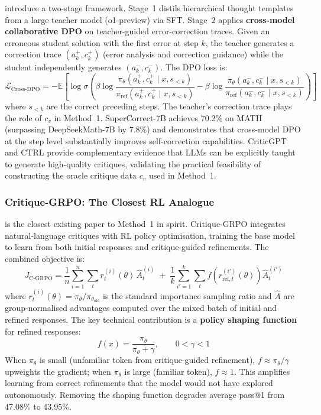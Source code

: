 \autocite{yang2024supercorrect} introduce a two-stage framework. Stage~1 distils hierarchical thought templates from a large teacher model (o1-preview) via SFT. Stage~2 applies \textbf{cross-model collaborative DPO} on teacher-guided error-correction traces. Given an erroneous student solution with the first error at step $k$, the teacher generates a correction trace $(a_k^+, c_k^+)$ (error analysis and correction guidance) while the student independently generates $(a_k^-, c_k^-)$. The DPO loss is:
\begin{equation}
    \mathcal{L}_{\text{Cross-DPO}} = -\mathbb{E}\!\left[\log\sigma\!\left(\beta\log\frac{\pi_\theta(a_k^+, c_k^+ \mid x, s_{<k})}{\pi_{\text{ref}}(a_k^+, c_k^+ \mid x, s_{<k})} - \beta\log\frac{\pi_\theta(a_k^-, c_k^- \mid x, s_{<k})}{\pi_{\text{ref}}(a_k^-, c_k^- \mid x, s_{<k})}\right)\right]
    \label{eq:supercorrect}
\end{equation}
where $s_{<k}$ are the correct preceding steps. The teacher's correction trace plays the role of $c_v$ in Method~1. SuperCorrect-7B achieves 70.2\% on MATH (surpassing DeepSeekMath-7B by 7.8\%) and demonstrates that cross-model DPO at the step level substantially improves self-correction capabilities. CriticGPT \autocite{mcaleese2024llmcriticshelpllm} and CTRL \autocite{xie2025teachinglanguagemodelscritique} provide complementary evidence that LLMs can be explicitly taught to generate high-quality critiques, validating the practical feasibility of constructing the oracle critique data $c_v$ used in Method~1.

\subsubsection{Critique-GRPO: The Closest RL Analogue}
\label{sec:critique-grpo}

\autocite{zhang2025critiquegrpoadvancingllm} is the closest existing paper to Method~1 in spirit. Critique-GRPO integrates natural-language critiques with RL policy optimisation, training the base model to learn from both initial responses and critique-guided refinements. The combined objective is:
\begin{equation}
    J_{\text{C-GRPO}} = \frac{1}{n}\sum_{i=1}^{n}\sum_{t} r_t^{(i)}(\theta)\, \hat{A}_t^{(i)} \;+\; \frac{1}{k}\sum_{i'=1}^{k}\sum_{t} f\!\left(r_{\text{ref},t}^{(i')}(\theta)\right) \hat{A}_t^{(i')}
    \label{eq:critique_grpo}
\end{equation}
where $r_t^{(i)}(\theta) = \pi_\theta / \pi_{\theta_{\text{old}}}$ is the standard importance sampling ratio and $\hat{A}$ are group-normalised advantages computed over the mixed batch of initial and refined responses. The key technical contribution is a \textbf{policy shaping function} for refined responses:
$$
    f(x) = \frac{\pi_\theta}{\pi_\theta + \gamma}, \qquad 0 < \gamma < 1
$$
When $\pi_\theta$ is small (unfamiliar token from critique-guided refinement), $f \approx \pi_\theta / \gamma$ upweights the gradient; when $\pi_\theta$ is large (familiar token), $f \approx 1$. This amplifies learning from correct refinements that the model would not have explored autonomously. Removing the shaping function degrades average pass@1 from 47.08\% to 43.95\%.

